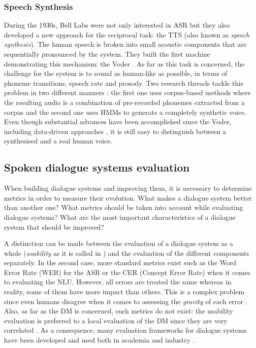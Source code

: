                         \subsubsection{Speech Synthesis}

                        During the 1930s, Bell Labs were not only interested in ASR but they also developed a new approach for the reciprocal task: the TTS (also known as \textit{speech synthesis}). The human speech is broken into small acoustic components that are sequentially pronounced by the system. They built the first machine demonstrating this mechanism: the Voder \cite{Dudley1939}. As far as this task is concerned, the challenge for the system is to sound as human-like as possible, in terms of phoneme transitions, speech rate and prosody. Two research threads tackle this problem in two different manners \cite{Tabet2011}: the first one uses corpus-based methods where the resulting audio is a combination of pre-recorded phonemes extracted from a corpus and the second one uses HMMs to generate a completely synthetic voice. Even though substantial advances have been accomplished since the Voder, including data-driven approaches \cite{Yu2011}, it is still easy to distinguish between a synthesised and a real human voice.

                        \subsection{Spoken dialogue systems evaluation}

                        When building dialogue systems and improving them, it is necessary to determine metrics in order to measure their evolution. What makes a dialogue system better than another one? What metrics should be taken into account while evaluating dialogue systems? What are the most important characteristics of a dialogue system that should be improved?
                        
                        A distinction can be made between the evaluation of a dialogue system as a whole (\textit{usability} as it is called in \cite{Moller2007}) and the evaluation of the different components separately. In the second case, more standard metrics exist such as the Word Error Rate (WER) for the ASR or the CER (Concept Error Rate) when it comes to evaluating the NLU. However, all errors are treated the same whereas in reality, some of them have more impact than others. This is a complex problem since even humans disagree when it comes to assessing the \textit{gravity} of each error \cite{Rosset2013}. Also, as far as the DM is concerned, such metrics do not exist: the usability evaluation is preferred to a local evaluation of the DM since they are very correlated \cite{Dybkjaer2004}. As a consequence, many evaluation frameworks for dialogue systems have been developed and used both in academia \cite{Walker1997,Hone2000,Schmitt2012} and industry \cite{Evanini2008,Witt2011}.

